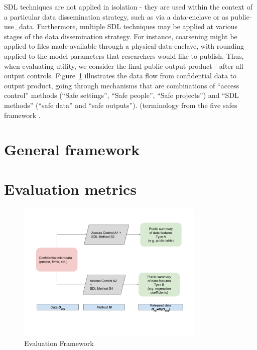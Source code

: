 \documentclass[12pt]{article}
\begin{document}
\gls{SDL} techniques are not applied in isolation - they are used within the context of a particular data dissemination strategy, such as via a \gls{data-enclave} or as \gls{public-use_data}. Furthermore, multiple \gls{SDL} techniques may be applied at various stages of the data dissemination strategy. For instance, \gls{coarsening} might be applied to files made available through a \gls{physical-data-enclave}, with \gls{rounding} applied to the model parameters that researchers would like to publish. Thus, when evaluating utility, we consider the final public output product - after all output controls. Figure~\ref{fig:framework} illustrates the data flow from confidential data to output product, going through  mechanisms that are combinations of ``access control'' methods (``Safe settings'', ``Safe people'', ``Safe projects'') and ``SDL methods'' (``safe data'' and ``safe outputs''). (terminology from the five safes framework \parencite{desai_five_2016}.

\section{General framework}\label{sec:generalframework}







\section{Evaluation metrics}\label{sec:overview_metrics}


\begin{figure}
    \centering
\includegraphics[width=0.8\textwidth]{SDL+Access control.png}
    \caption{Evaluation Framework}
    \label{fig:framework}
\end{figure}
\end{document}
